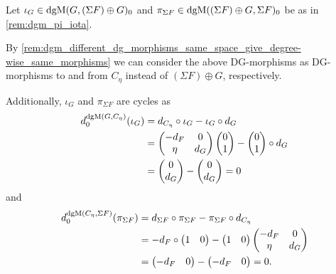 \begin{remark}
    \label{rem:dgm_differentials_of_inclusions_and_projections_of_cone}
    Let \( \iota_G \in \operatorname{dgM}(G, (\Sigma F) \oplus G)_0 \) and \( \pi_{\Sigma F} \in \operatorname{dgM}((\Sigma F) \oplus G, \Sigma F)_0 \) be as in \autoref{rem:dgm_pi_iota}.

    By \autoref{rem:dgm_different_dg_morphisms_same_space_give_degree-wise_same_morphisms} we can consider the above DG-morphisms as DG-morphisms to and from \( C_{\eta} \) instead of \( (\Sigma F) \oplus G \), respectively.

    Additionally, \( \iota_G \) and \( \pi_{\Sigma F} \) are cycles as
    \begin{align*}
        d_0^{\operatorname{dgM}(G, C_{\eta})}(\iota_G) &= d_{C_{\eta}} \circ \iota_G - \iota_G \circ d_G \\
        &=
        \begin{pmatrix}
            -d_F & 0 \\
            \eta & d_G
        \end{pmatrix}
        \begin{pmatrix}
            0 \\
            1
        \end{pmatrix}
        -
        \begin{pmatrix}
            0 \\
            1
        \end{pmatrix}
        \circ d_G \\
        &=
        \begin{pmatrix}
            0 \\
            d_G
        \end{pmatrix}
        -
        \begin{pmatrix}
            0 \\
            d_G
        \end{pmatrix}
        = 0
    \end{align*}
    and
    \begin{align*}
        d_0^{\operatorname{dgM}(C_{\eta}, \Sigma F)}(\pi_{\Sigma F}) &= d_{\Sigma F} \circ \pi_{\Sigma F} - \pi_{\Sigma F} \circ d_{C_{\eta}} \\
        &= -d_F \circ
        \begin{pmatrix}
            1 & 0
        \end{pmatrix}
        -
        \begin{pmatrix}
            1 & 0
        \end{pmatrix}
        \begin{pmatrix}
            -d_F & 0 \\
            \eta & d_G
        \end{pmatrix} \\
        &=
        \begin{pmatrix}
            -d_F & 0
        \end{pmatrix}
        -
        \begin{pmatrix}
            -d_F & 0
        \end{pmatrix}
        = 0.
    \end{align*}


\end{remark}
